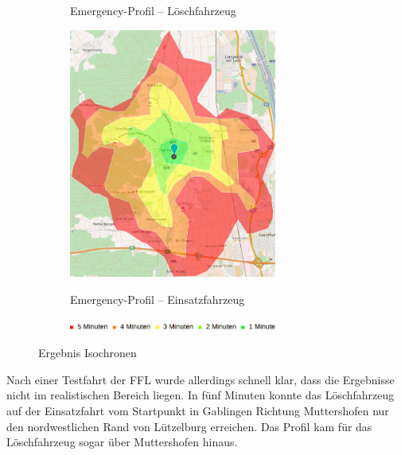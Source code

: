 \begin{figure}[h]
\begin{subfigure}{0.49\textwidth}
\caption{Emergency-Profil -- Löschfahrzeug}
\label{fig:isofire}
\end{subfigure}
\begin{subfigure}{0.49\textwidth}
\centering
\includegraphics[width = 0.75\textwidth]{../media/isoeme.png} \\
\caption{Emergency-Profil -- Einsatzfahrzeug}
\label{fig:isoeme}
\end{subfigure}
\begin{subfigure}{0.90\textwidth}
\centering
\includegraphics[width = 0.75\textwidth]{../media/legendiso.png} \\
\end{subfigure}
\caption{Ergebnis Isochronen}
\label{fig:isochrones}
\end{figure}


Nach einer Testfahrt der FFL wurde allerdings schnell klar, dass die Ergebnisse nicht im realistischen Bereich liegen. In fünf Minuten konnte das Löschfahrzeug auf der Einsatzfahrt vom Startpunkt in Gablingen Richtung Muttershofen nur den nordwestlichen Rand von Lützelburg erreichen. Das Profil kam für das Löschfahrzeug sogar über Muttershofen hinaus.



